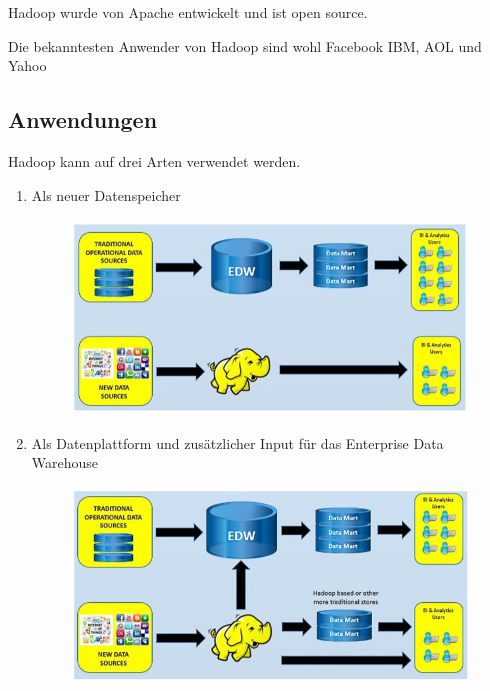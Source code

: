 \documentclass[a4paper, 11pt, nofootinbib]{article}
\begin{document}
\vspace{10px}

\noindent Hadoop wurde von Apache entwickelt und ist open source. 

\vspace{10px}

\noindent Die bekanntesten Anwender von Hadoop sind wohl Facebook IBM, AOL und Yahoo

\subsection{Anwendungen}
Hadoop kann auf drei Arten verwendet werden.

\begin{enumerate}
	\item Als neuer Datenspeicher
	\begin{figure}[htb!]
		\centering
		\includegraphics[keepaspectratio=true,height=9\baselineskip]{neuer_Datenspeicher.PNG}
	\end{figure}
	\item Als Datenplattform und zusätzlicher Input für das Enterprise Data Warehouse
	\begin{figure}[htb!]
		\centering
		\includegraphics[keepaspectratio=true,height=9\baselineskip]{datei_plattform.PNG}
	\end{figure}

\end{enumerate}
\end{document}
